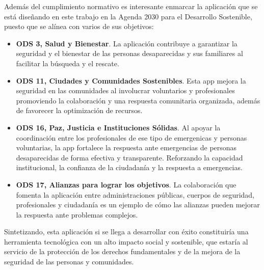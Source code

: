    Además del cumplimiento normativo es interesante enmarcar la aplicación que se está diseñando en este trabajo en la Agenda 2030\cite{onu_ODS,moncloa_agenda2030} para el Desarrollo Sostenible, puesto que se alínea con varios de sus objetivos:
    \begin{itemize}
        \item \textbf{ODS 3, Salud y Bienestar}. La aplicación contribuye a garantizar la seguridad y el bienestar de las personas desaparecidas y sus familiares al facilitar la búsqueda y el rescate.
        \item \textbf{ODS 11, Ciudades y Comunidades Sostenibles}. Esta app mejora la seguridad en las comunidades al involucrar voluntarios y profesionales promoviendo la colaboración y una respuesta comunitaria organizada, además de favorecer la optimización de recursos.
        \item \textbf{ODS 16, Paz, Justicia e Instituciones Sólidas}. Al apoyar la coordinación entre los profesionales de ese tipo de emergenicas y personas voluntarias, la app fortalece la respuesta ante emergencias de personas desaparecidas de forma efectiva y transparente. Reforzando la capacidad institucional, la confianza de la ciudadanía y la respuesta a emergencias.
        \item \textbf{ODS 17, Alianzas para lograr los objetivos}. La colaboración que fomenta la aplicación entre administraciones públicas, cuerpos de seguridad, profesionales y ciudadanía es un ejemplo de cómo las alianzas pueden mejorar la respuesta ante problemas complejos.
        
    \end{itemize}

    Sintetizando, esta aplicación si se llega a desarrollar con éxito constituiría una herramienta tecnológica con un alto impacto social y sostenible, que estaría al servicio de la protección de los derechos fundamentales y de la mejora de la seguridad de las personas y comunidades.

    